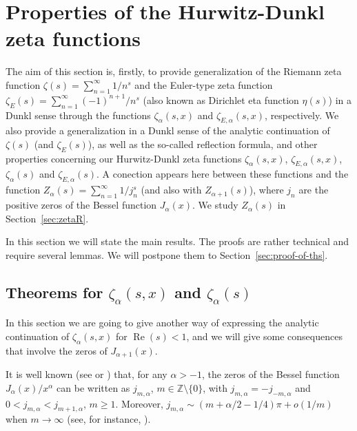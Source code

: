 \documentclass[a4paper]{amsart}
\newcommand{\Z}{\mathbb{Z}}
\renewcommand{\Re}{\operatorname{Re}}
\theoremstyle{plain}
\theoremstyle{definition}
\theoremstyle{remark}
\numberwithin{equation}{section}
\begin{document}
\section{Properties of the Hurwitz-Dunkl zeta functions} 
\label{sec:prop-hurwitz}

The aim of this section is, firstly, to provide generalization of the Riemann zeta function $\zeta(s) = \sum_{n=1}^{\infty} 1/n^s$ and the Euler-type zeta function $\zeta_E(s) = \sum_{n=1}^{\infty} (-1)^{n+1}/n^s$ (also known as Dirichlet eta function $\eta(s)$) in a Dunkl sense through the functions $\zeta_\alpha(s,x)$ and $\zeta_{E,\alpha}(s,x)$, respectively. We also provide a generalization in a Dunkl sense of the analytic continuation of $\zeta(s)$ (and $\zeta_E(s)$), as well as the so-called reflection formula, and other properties concerning our Hurwitz-Dunkl zeta functions $\zeta_\alpha(s,x)$, $\zeta_{E,\alpha}(s,x)$, $\zeta_\alpha(s)$ and $\zeta_{E,\alpha}(s)$. A conection appears here between these functions and the function $Z_\alpha(s) = \sum_{n=1}^{\infty}1/j_{n}^s$ (and also with $Z_{\alpha+1}(s)$), where $j_n$ are the positive zeros of the Bessel function $J_{\alpha}(x)$. We study $Z_\alpha(s)$ in Section~\ref{sec:zetaR}.

In this section we will state the main results. The proofs are rather technical and require several lemmas. We will postpone them to Section~\ref{sec:proof-of-ths}.

\subsection{Theorems for $\zeta_\alpha(s,x)$ and  $\zeta_\alpha(s)$}
\label{subsec:teosza}

In this section we are going to give another way of expressing the analytic continuation of $\zeta_{\alpha}(s,x)$ for $\Re(s)<1$, and we will give some consequences that involve the zeros of $J_{\alpha+1}(x)$. 


It is well known (see \cite[Chapter 15]{Wat} or \cite[\S\,10.21]{OlMa-NIST}) that, for any $\alpha>-1$, the zeros of the Bessel function $J_{\alpha}(x)/x^{\alpha}$ can be written as $j_{m,\alpha}$, $m\in \Z \setminus\{0\}$, with $j_{m,\alpha} = -j_{-m,\alpha}$ and $0< j_{m,\alpha} < j_{m+1,\alpha}$, $m\ge 1$.
Moreover, $j_{m,\alpha} \sim (m + \alpha/2 - 1/4)\pi + o(1/m)$ when $m \to \infty$ (see, for instance, \cite[10.21.19] {OlMa-NIST}).
\end{document}
